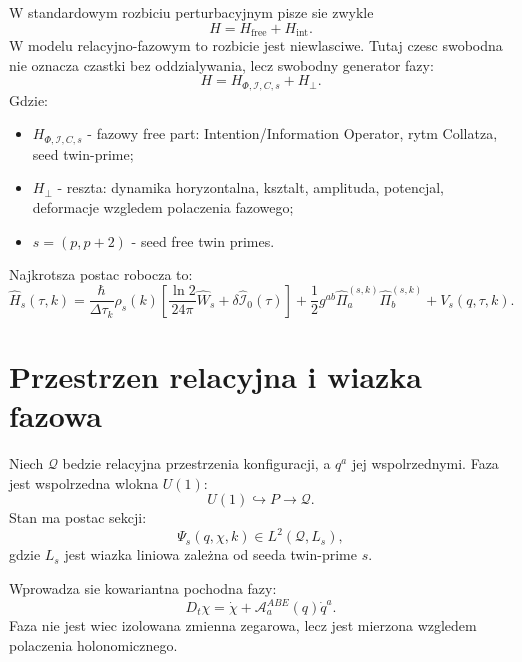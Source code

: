\documentclass[11pt,a4paper]{article}
\newcommand{\Iop}{\hat{\mathcal I}}
\newcommand{\Wop}{\hat W}
\newcommand{\Abe}{\mathcal A^{ABE}}
\newcommand{\Q}{\mathcal Q}
\newcommand{\Hs}{\hat H_s}
\begin{document}
W standardowym rozbiciu perturbacyjnym pisze sie zwykle
\begin{equation}
H = H_{\mathrm{free}} + H_{\mathrm{int}}.
\end{equation}
W modelu relacyjno-fazowym to rozbicie jest niewlasciwe. Tutaj czesc swobodna nie oznacza czastki bez oddzialywania, lecz swobodny generator fazy:
\begin{equation}
\boxed{H = H_{\Phi,\mathcal I,C,s} + H_{\perp}.}
\end{equation}
Gdzie:
\begin{itemize}[leftmargin=*]
\item $H_{\Phi,\mathcal I,C,s}$ - fazowy free part: Intention/Information Operator, rytm Collatza, seed twin-prime;
\item $H_{\perp}$ - reszta: dynamika horyzontalna, ksztalt, amplituda, potencjal, deformacje wzgledem polaczenia fazowego;
\item $s=(p,p+2)$ - seed free twin primes.
\end{itemize}

Najkrotsza postac robocza to:
\begin{equation}
\boxed{
\Hs(\tau,k)
=
\frac{\hbar}{\Delta\tau_k}\rho_s(k)
\left[\frac{\ln2}{24\pi}\Wop_s+\delta\Iop_{0}(\tau)\right]
+
\frac12 g^{ab}\hat\Pi_a^{(s,k)}\hat\Pi_b^{(s,k)}
+V_s(q,\tau,k).}
\label{eq:main_hamiltonian}
\end{equation}

\section{Przestrzen relacyjna i wiazka fazowa}

Niech $\Q$ bedzie relacyjna przestrzenia konfiguracji, a $q^a$ jej wspolrzednymi. Faza jest wspolrzedna wlokna $U(1)$:
\begin{equation}
U(1) \hookrightarrow P \rightarrow \Q.
\end{equation}
Stan ma postac sekcji:
\begin{equation}
\Psi_s(q,\chi,k) \in L^2(\Q,L_s),
\end{equation}
gdzie $L_s$ jest wiazka liniowa zależna od seeda twin-prime $s$.

Wprowadza sie kowariantna pochodna fazy:
\begin{equation}
D_t\chi = \dot\chi + \Abe_a(q)\dot q^a.
\end{equation}
Faza nie jest wiec izolowana zmienna zegarowa, lecz jest mierzona wzgledem polaczenia holonomicznego.
\end{document}
